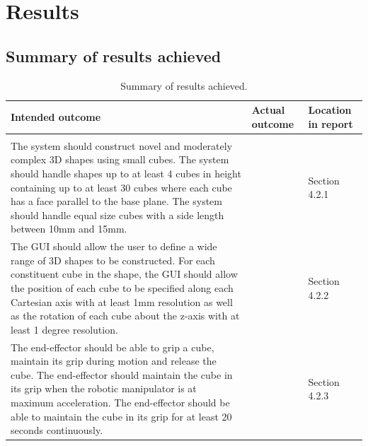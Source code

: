 
\section{Results}

\subsection{Summary of results achieved}

\begin{table}[H]
	\renewcommand{\arraystretch}{1.3}
	\centering
	\begin{tabular}{|>{\raggedright}m{6.5cm}|>{\raggedright}m{5cm}|>{\raggedright\arraybackslash}m{2.2cm}|}
		\hline
		\textbf{Intended outcome} & \textbf{Actual outcome} & \textbf{Location in report} \\
		\hline
		\multicolumn{3}{|l|}{\textbf{Core mission requirements and specifications}} \\
		\hline
		The system should construct novel and moderately complex 3D shapes using small cubes. The system should handle shapes up to at least 4 cubes in height containing up to at least 30 cubes where each cube has a face parallel to the base plane. The system should handle equal size cubes with a side length between 10mm and 15mm. & & Section 4.2.1 \\
		\hline
		The GUI should allow the user to define a wide range of 3D shapes to be constructed. For each constituent cube in the shape, the GUI should allow the position of each cube to be specified along each Cartesian axis with at least 1mm resolution as well as the rotation of each cube about the z-axis with at least 1 degree resolution. & & Section 4.2.2 \\
		\hline
		The end-effector should be able to grip a cube, maintain its grip during motion and release the cube. The end-effector should maintain the cube in its grip when the robotic manipulator is at maximum acceleration. The end-effector should be able to maintain the cube in its grip for at least 20 seconds continuously. &  & Section 4.2.3 \\
		\hline
	\end{tabular}
	\caption{\label{tab:results_summary_p1}Summary of results achieved.}
\end{table}


